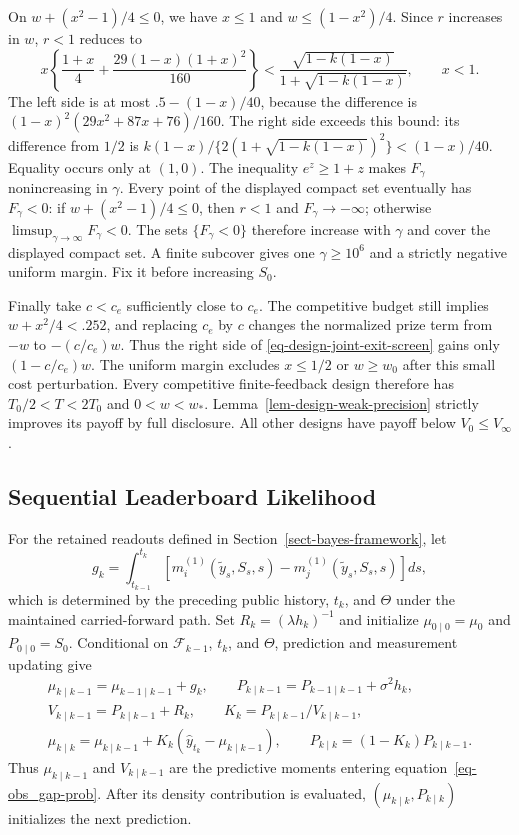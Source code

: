 \documentclass[mnsc]{informs3}
\begin{document}
\begin{APPENDICES}
{On $w+(x^2-1)/4\leq0$, we have $x\leq1$ and
$w\leq(1-x^2)/4$. Since $r$ increases in $w$, $r<1$
reduces to
\[
x\left\{\frac{1+x}{4}+\frac{29(1-x)(1+x)^2}{160}\right\}
<\frac{\sqrt{1-k(1-x)}}{1+\sqrt{1-k(1-x)}},\qquad x<1.
\]
The left side is at most $.5-(1-x)/40$, because the difference is
$(1-x)^2(29x^2+87x+76)/160$.
The right side exceeds this bound: its difference from $1/2$ is
$k(1-x)/\{2(1+\sqrt{1-k(1-x)})^2\}<(1-x)/40$.
Equality occurs only at $(1,0)$.
The inequality $e^z\geq1+z$ makes $F_\gamma$ nonincreasing in $\gamma$.
Every point of the displayed compact set eventually has $F_\gamma<0$:
if $w+(x^2-1)/4\leq0$, then $r<1$ and $F_\gamma\to-\infty$;
otherwise $\limsup_{\gamma\to\infty}F_\gamma<0$.
The sets $\{F_\gamma<0\}$ therefore increase with $\gamma$ and cover the
displayed compact set. A finite subcover gives one
$\gamma\geq10^6$ and a strictly negative uniform margin.
Fix it before increasing $S_0$.

Finally take $c<c_e$ sufficiently close to $c_e$.
The competitive budget still implies $w+x^2/4<.252$,
and replacing $c_e$ by $c$ changes the normalized prize term from
$-w$ to $-(c/c_e)w$. Thus the right side of
\eqref{eq-design-joint-exit-screen} gains only $(1-c/c_e)w$.
The uniform margin excludes $x\leq1/2$ or $w\geq w_0$
after this small cost perturbation.
Every competitive finite-feedback design therefore has
$T_0/2<T<2T_0$ and $0<w<w_*$.
Lemma~\ref{lem-design-weak-precision} strictly improves its payoff
by full disclosure. All other designs have payoff below
$V_0\leq V_\infty$.
\Halmos
\endproof

}

\subsection{Sequential Leaderboard Likelihood}\label{app-leaderboard-recursion}

For the retained readouts defined in Section~\ref{sect-bayes-framework}, let
\[
g_k=\int_{t_{k-1}}^{t_k}
\left[m_i^{(1)}(\tilde y_s,S_s,s)-m_j^{(1)}(\tilde y_s,S_s,s)\right]ds,
\]
which is determined by the preceding public history, $t_k$, and $\Theta$ under the maintained carried-forward path. Set $R_k=(\lambda h_k)^{-1}$ and initialize $\mu_{0\mid0}=\mu_0$ and $P_{0\mid0}=S_0$. Conditional on $\mathcal F_{k-1}$, $t_k$, and $\Theta$, prediction and measurement updating give
\[
\begin{gathered}
\mu_{k\mid k-1}=\mu_{k-1\mid k-1}+g_k,\qquad
P_{k\mid k-1}=P_{k-1\mid k-1}+\sigma^2h_k,\\
V_{k\mid k-1}=P_{k\mid k-1}+R_k,\qquad
K_k=P_{k\mid k-1}/V_{k\mid k-1},\\
\mu_{k\mid k}=\mu_{k\mid k-1}
+K_k(\hat y_{t_k}-\mu_{k\mid k-1}),\qquad
P_{k\mid k}=(1-K_k)P_{k\mid k-1}.
\end{gathered}
\]
Thus $\mu_{k\mid k-1}$ and $V_{k\mid k-1}$ are the predictive moments entering equation~\eqref{eq-obs_gap-prob}. After its density contribution is evaluated, $(\mu_{k\mid k},P_{k\mid k})$ initializes the next prediction.


\end{APPENDICES}
\end{document}
